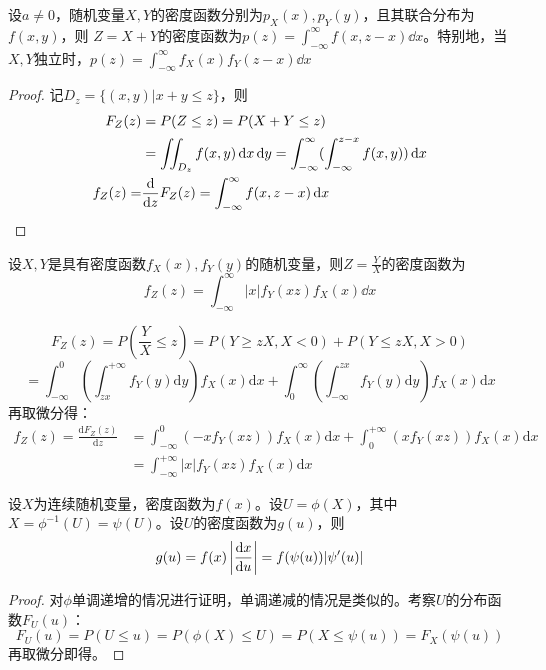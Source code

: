 \documentclass[UTF-8]{ctexbeamer}
\begin{document}
\begin{frame}
  \begin{Lemma}
    设$a\neq 0$，随机变量$X,Y$的密度函数分别为$p_{X}(x),p_{Y}(y)$，且其联合分布为$f(x,y)$，则
    $Z=X+Y$的密度函数为$p(z)=\int_{-\infty}^{\infty}f(x,z-x)\dd x$。特别地，当$X,Y$独立时，$p(z)=\int_{-\infty}^{\infty}f_{X}(x)f_{Y}(z-x)\dd x$
      \end{Lemma}
      
  \begin{proof}
  记$D_{z}=\{(x,y)|x+y\leq z\}$，则
  \begin{align*}
    F_{Z}(z)&=P(Z\leq z)=P(X+Y\leq z)\\
            &=\iint_{D_{z}}f(x,y)\,\mathrm{d} x\,\mathrm{d} y=\int_{-\infty}^{\infty}(\int_{-\infty}^{z-x}f(x,y))\,\mathrm{d} x\\
    f_{Z}(z)=&\frac{\mathrm{d} }{\mathrm{d} z}F_{Z}(z)=\int_{-\infty}^{\infty}f(x,z-x)\,\mathrm{d} x
  \end{align*}
  \end{proof}
\end{frame}


\begin{frame}
  \begin{Lemma}[随机变量之商的密度函数]
    设$X,Y$是具有密度函数$f_{X}(x),f_{Y}(y)$的随机变量，则$Z=\frac{Y}{X}$的密度函数为
    \[f_{Z}(z)=\int_{-\infty}^{\infty}|x|f_{Y}(xz)f_{X}(x)\dd x\]
  \end{Lemma}
    $$
F_{Z}(z)=P\left(\frac{Y}{X} \leq z\right)=P(Y \geq z X, X<0)+P(Y \leq z X, X>0)
$$
$$
=\int_{-\infty}^{0}\left(\int_{z x}^{+\infty} f_{Y}(y) \mathrm{d} y\right) f_{X}(x) \mathrm{d} x+\int_{0}^{\infty}\left(\int_{-\infty}^{z x} f_{Y}(y) \mathrm{d} y\right) f_{X}(x) \mathrm{d} x
$$
再取微分得：
$$
\begin{aligned}
f_{Z}(z)=\frac{\mathrm{d} F_{Z}(z)}{\mathrm{d} z} &=\int_{-\infty}^{0}\left(-x f_{Y}(x z)\right) f_{X}(x) \mathrm{d} x+\int_{0}^{+\infty}\left(x f_{Y}(x z)\right) f_{X}(x) \mathrm{d} x \\
&=\int_{-\infty}^{+\infty}|x| f_{Y}(x z) f_{X}(x) \mathrm{d} x
\end{aligned}
$$
\end{frame}

\begin{frame}
  \begin{Thm}
    设$X$为连续随机变量，密度函数为$f(x)$。设$U=\phi(X)$，其中$X=\phi^{-1}(U)=\psi(U)$。设$U$的密度函数为$g(u)$，则
    \[g(u)=f(x)\left|\frac{\mathrm{d} x}{\mathrm{d} u}\right|=f(\psi(u))|\psi'(u)|\]
  \end{Thm}
  \begin{proof}
    对$\phi$单调递增的情况进行证明，单调递减的情况是类似的。考察$U$的分布函数$F_{U}(u)$：
    \[F_{U}(u)=P(U\leq u)=P(\phi(X)\leq U)=P(X\leq \psi(u))=F_{X}(\psi(u))\]
    再取微分即得。
   \end{proof}
\end{frame}
\end{document}
